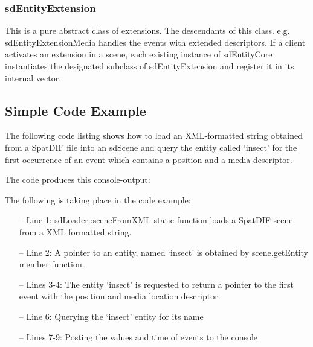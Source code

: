 \documentclass[a4paper]{article}
\begin{document}
\subsubsection{sdEntityExtension}
This is a pure abstract class of extensions. The descendants of this class. e.g. sdEntityExtensionMedia handles the events with extended descriptors. 
If a client activates an extension in a scene, each existing instance of sdEntityCore instantiates the designated subclass of sdEntityExtension and register it in its internal vector.

\subsection{Simple Code Example}
The following code listing shows how to load an XML-formatted string obtained from a SpatDIF file into an sdScene and query the entity called `insect' for the first occurrence of an event which contains a position and a media descriptor.

\vfill

 


\noindent The code produces this console-output: 
 

\noindent 
The following is taking place in the code example:

\begin{itemize}[leftmargin=*]
\item[--] Line 1: sdLoader::sceneFromXML static function loads a SpatDIF scene from a XML formatted string.
\item[--] Line 2: A pointer to an entity, named `insect' is obtained by scene.getEntity member function.
\item[--] Lines 3-4: The entity `insect' is requested to return a pointer to the first event with the position and media location descriptor.
\item[--] Line 6: Querying the `insect' entity for its name
\item[--] Lines 7-9: Posting the values and time of events to the console
\end{itemize}

\end{document}
